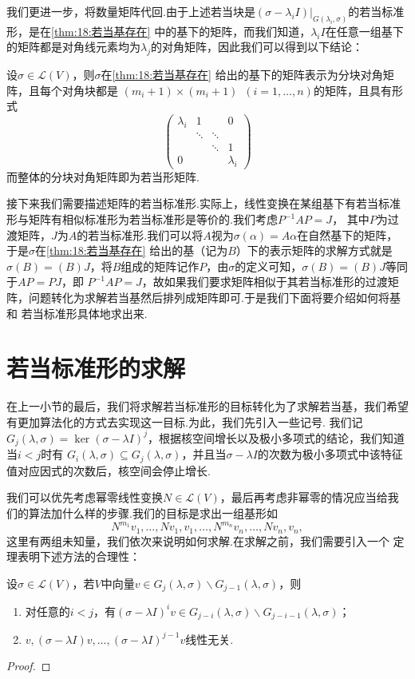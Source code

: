 我们更进一步，将数量矩阵代回.由于上述若当块是$(\sigma-\lambda_iI)\vert_{G(\lambda_i,\sigma)}$的若当标准形，是在\autoref{thm:18:若当基存在}
中的基下的矩阵，而我们知道，$\lambda_iI$在任意一组基下的矩阵都是对角线元素均为$\lambda_j$的对角矩阵，因此我们可以得到以下结论：
\begin{theorem}
    设$\sigma\in \mathcal{L}(V)$，则$\sigma$在\autoref{thm:18:若当基存在} 给出的基下的矩阵表示为分块对角矩阵，且每个对角块都是
    $(m_i+1)\times(m_i+1)\enspace(i=1,\ldots,n)$的矩阵，且具有形式\[\begin{pmatrix}
        \lambda_i & 1 &  & 0 \\  & \ddots & \ddots &  \\  &  &  \ddots & 1 \\ 0 &  &  & \lambda_i
    \end{pmatrix}\]而整体的分块对角矩阵即为若当形矩阵.
\end{theorem}

接下来我们需要描述矩阵的若当标准形.实际上，线性变换在某组基下有若当标准形与矩阵有相似标准形为若当标准形是等价的.我们考虑$P^{-1}AP=J$，
其中$P$为过渡矩阵，$J$为$A$的若当标准形.我们可以将$A$视为$\sigma(\alpha)=A\alpha$在自然基下的矩阵，于是$\sigma$在\autoref{thm:18:若当基存在}
给出的基（记为$B$）下的表示矩阵的求解方式就是$\sigma(B)=(B)J$，将$B$组成的矩阵记作$P$，由$\sigma$的定义可知，$\sigma(B)=(B)J$等同于$AP=PJ$，即
$P^{-1}AP=J$，故如果我们要求矩阵相似于其若当标准形的过渡矩阵，问题转化为求解若当基然后排列成矩阵即可.于是我们下面将要介绍如何将基和
若当标准形具体地求出来.

\section{若当标准形的求解}
在上一小节的最后，我们将求解若当标准形的目标转化为了求解若当基，我们希望有更加算法化的方式去实现这一目标.为此，我们先引入一些记号.
我们记$G_j(\lambda,\sigma)=\ker (\sigma-\lambda I)^j$，根据核空间增长以及极小多项式的结论，我们知道当$i<j$时有
$G_i(\lambda,\sigma)\subseteq G_j(\lambda,\sigma)$，并且当$\sigma-\lambda I$的次数为极小多项式中该特征值对应因式的次数后，核空间会停止增长.

我们可以优先考虑幂零线性变换$N\in \mathcal{L}(V)$，最后再考虑非幂零的情况应当给我们的算法加什么样的步骤.我们的目标是求出一组基形如
\[N^{m_1}v_1,\ldots,Nv_1,v_1,\ldots,N^{m_n}v_n,\ldots,Nv_n,v_n,\]
这里有两组未知量，我们依次来说明如何求解.在求解之前，我们需要引入一个
定理表明下述方法的合理性：
\begin{theorem}
    设$\sigma\in \mathcal{L}(V)$，若$V$中向量$v\in G_j(\lambda,\sigma)\backslash G_{j-1}(\lambda,\sigma)$，则
    \begin{enumerate}
        \item 对任意的$i<j$，有$(\sigma-\lambda I)^iv\in G_{j-i}(\lambda,\sigma)\backslash G_{j-i-1}(\lambda,\sigma)$；

        \item $v,(\sigma-\lambda I)v,\ldots,(\sigma-\lambda I)^{j-1}v$线性无关.
    \end{enumerate}
\end{theorem}
\begin{proof}
    
\end{proof}

